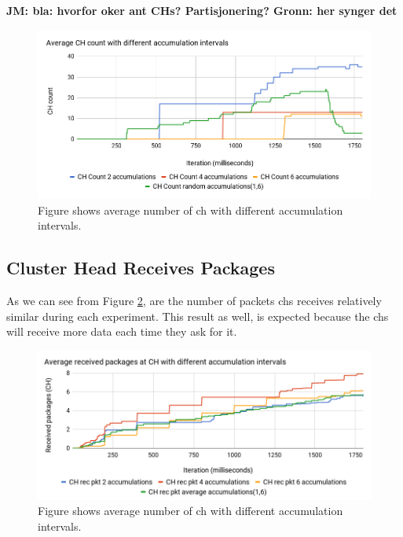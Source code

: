 \documentclass[USenglish]{uit-thesis}
\begin{document}
\textbf{JM: bla: hvorfor oker ant CHs? Partisjonering? Gronn: her synger det}

\begin{figure} [ht]
\centering
\includegraphics[width=\textwidth]{chCountChart.png}
\caption{Figure shows average number of \gls{ch} with different accumulation intervals.}
\label{fig:chCountChart}
\end{figure}


\newpage

\subsection{Cluster Head Receives Packages}

As we can see from Figure \ref{fig:recPktChart}, are the number of packets \gls{ch}s receives relatively similar during each experiment. This result as well, is expected because the \gls{ch}s will receive more data each time they ask for it.

\begin{figure} [ht]
\centering
\includegraphics[width=\textwidth]{recPktChart.png}
\caption{Figure shows average number of \gls{ch} with different accumulation intervals.}
\label{fig:recPktChart}
\end{figure}
\end{document}
